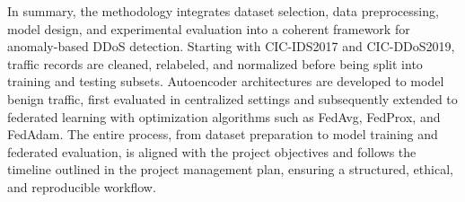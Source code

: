 In summary, the methodology integrates dataset selection, data preprocessing, model design, and experimental evaluation into a coherent framework for anomaly-based DDoS detection. Starting with CIC-IDS2017 and CIC-DDoS2019, traffic records are cleaned, relabeled, and normalized before being split into training and testing subsets. Autoencoder architectures are developed to model benign traffic, first evaluated in centralized settings and subsequently extended to federated learning with optimization algorithms such as FedAvg, FedProx, and FedAdam. The entire process, from dataset preparation to model training and federated evaluation, is aligned with the project objectives and follows the timeline outlined in the project management plan, ensuring a structured, ethical, and reproducible workflow.
